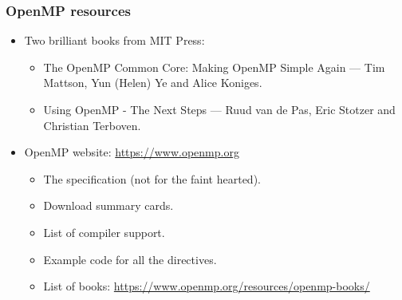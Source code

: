 \documentclass[aspectratio=169]{beamer}
\begin{document}
\begin{frame}
\frametitle{OpenMP resources}
\begin{itemize}
\item Two brilliant books from MIT Press:
\begin{itemize}
\item The OpenMP Common Core: Making OpenMP Simple Again --- Tim Mattson, Yun (Helen) Ye and Alice Koniges.
\item Using OpenMP - The Next Steps --- Ruud van de Pas, Eric Stotzer and Christian Terboven.
\end{itemize}
 \item OpenMP website: \url{https://www.openmp.org}
   \begin{itemize}
     \item The specification (not for the faint hearted).
     \item Download summary cards.
     \item List of compiler support.
     \item Example code for all the directives.
     \item List of books: \url{https://www.openmp.org/resources/openmp-books/}
   \end{itemize}
 
\end{itemize}
\end{frame}
\end{document}
